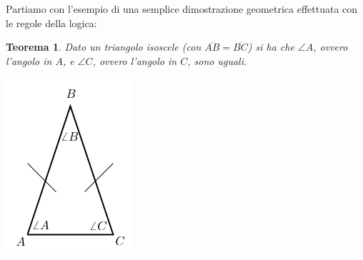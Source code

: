 \documentclass[a4paper]{report}
\newtheorem{teorema}{Teorema}[chapter]
\begin{document}
Partiamo con l'esempio di una semplice dimostrazione geometrica effettuata con le regole della logica:
\begin{teorema}
  Dato un triangolo isoscele (con $\overline{AB}=\overline{BC}$) si ha che $\angle A$, ovvero l'angolo in $A$,
  e $\angle C$, ovvero l'angolo in $C$, sono uguali.
\begin{center}
\includegraphics[scale=0.5]{img/tri.png}
\end{center}
\end{teorema}
\end{document}
